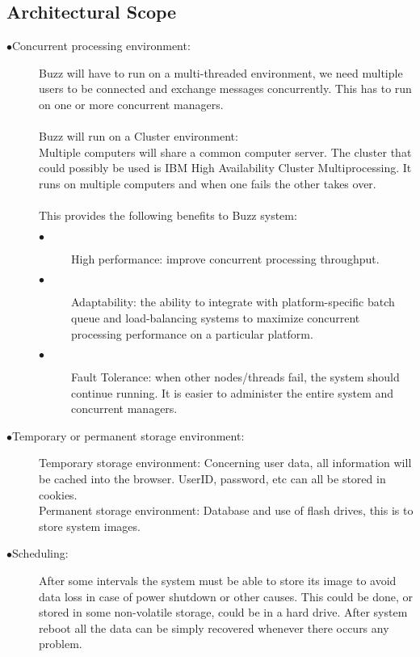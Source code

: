 \documentclass[hidelinks, 12pt]{article}
\begin{document}
\subsection{Architectural Scope}
\begin{description}
\item[$\bullet$Concurrent processing environment:]

Buzz will have to run on a multi-threaded environment, we need multiple users to be connected and exchange messages concurrently. This has to run on one or more concurrent managers.\\\\
Buzz will run on a Cluster environment:\\
Multiple computers will share a common computer server. The cluster that could possibly be used is IBM High Availability Cluster Multiprocessing. It runs on multiple computers and when one fails the other takes over.\\\\
This provides the following benefits to Buzz system:
\begin{description}
\item[$\bullet$] High performance: improve concurrent processing throughput.
\item[$\bullet$]Adaptability: the ability to integrate with platform-specific batch queue and load-balancing systems to maximize concurrent processing performance on a particular platform.
\item[$\bullet$] Fault Tolerance: when other nodes/threads fail, the system should continue running. It is easier to administer the entire system and concurrent managers.\\
\end{description}

\item[$\bullet$Temporary or permanent storage environment:]

Temporary storage environment: Concerning user data, all information will be cached into the browser. UserID, password, etc can all be stored in cookies.\\
Permanent storage environment: Database and use of flash drives, this is to store system images.\\

\item[$\bullet$Scheduling:]

After some intervals the system must be able to store its image to avoid data loss in case of power shutdown or other causes. This could be done, or stored in some non-volatile storage, could be in a hard drive. After system reboot all the data can be simply recovered whenever there occurs any problem.\\


\end{description}
\end{document}

